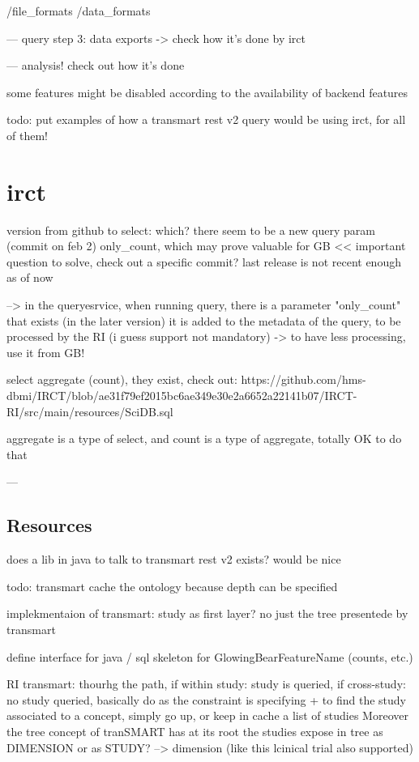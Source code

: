 /file\_formats
/data\_formats


--- query step 3: data exports
-> check how it's done by irct

--- analysis! check out how it's done



some features might be disabled according to the availability of backend features

todo: put examples of how a transmart rest v2 query would be using irct, for all of them!




\section{irct}
version from github to select: which? there seem to be a new query param (commit on feb 2) only\_count, which may prove valuable for GB << important question to solve, check out a specific commit? last release is not recent enough as of now 

--> in the queryesrvice, when running query, there is a parameter "only\_count" that exists (in the later version)
it is added to the metadata of the query, to be processed by the RI (i guess support not mandatory) 
-> to have less processing, use it from GB!

select aggregate (count), they exist, check out: https://github.com/hms-dbmi/IRCT/blob/ae31f79ef2015bc6ae349e30e2a6652a22141b07/IRCT-RI/src/main/resources/SciDB.sql

aggregate is a type of select, and count is a type of aggregate, totally OK to do that 



---
\subsection{Resources}
does a lib in java to talk to transmart rest v2 exists? would be nice


todo: transmart cache the ontology because depth can be specified

implekmentaion of transmart: study as first layer? no just the tree presentede by transmart

define interface for java / sql skeleton for GlowingBearFeatureName (counts, etc.)


RI transmart: thourhg the path, if within study: study is queried, if cross-study: no study queried, basically do as the constraint is specifying
+ to find the study associated to a concept, simply go up, or keep in cache a list of studies
Moreover the tree concept of tranSMART has at its root the studies
expose in tree as DIMENSION or as STUDY? --> dimension (like this lcinical trial also supported)
